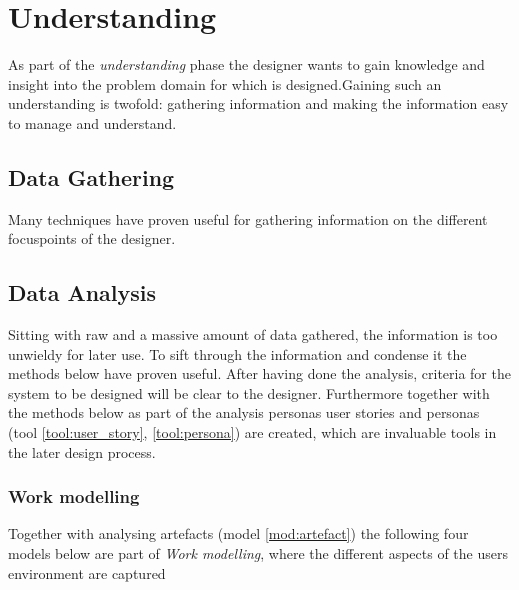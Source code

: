 \section{Understanding} \label{sec:understanding}
As part of the \emph{understanding} phase the designer wants to gain knowledge and insight into the problem domain for which is designed.Gaining such an understanding is twofold: gathering information and making the information easy to manage and understand.

\subsection{Data Gathering} \label{sec:data_gathering}
Many techniques have proven useful for gathering information on the different focuspoints of the designer.






\subsection{Data Analysis} \label{sec:data_analysis}
Sitting with raw and a massive amount of data gathered, the information is too unwieldy for later use. To sift through the information and condense it the methods below have proven useful. After having done the analysis, criteria for the system to be designed will be clear to the designer. Furthermore together with the methods below as part of the analysis personas user stories and personas (tool \ref{tool:user_story}, \ref{tool:persona}) are created, which are invaluable tools in the later design process.



\subsubsection{Work modelling}
Together with analysing artefacts (model \ref{mod:artefact}) the following four models below are part of \emph{Work modelling}, where the different aspects of the users environment are captured \cite[p. 277]{benyon_10} 






